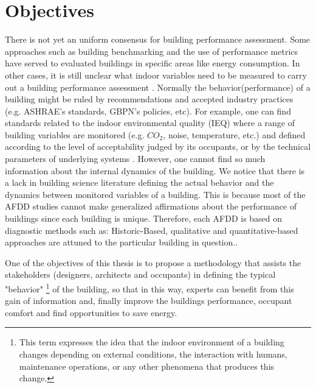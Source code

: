 
\section{Objectives}

There is not yet an uniform consensus for building performance assessment. Some approaches such as building benchmarking and the use of performance metrics have served to evaluated buildings in specific areas like energy consumption. In other cases, it is still unclear what indoor variables need to be measured to carry out a building performance assessment \cite{owens2012measuring, web_NIOSH}. Normally the behavior(performance) of a building might be ruled by recommendations and accepted industry practices (e.g. ASHRAE's standards, GBPN's policies, etc). For example, one can find standards related to the indoor environmental quality (IEQ) where a range of building variables are monitored (e.g. $CO_2$, noise, temperature, etc.) and defined according to the level of acceptability judged by its occupants, or by the technical parameters of underlying systems \cite{owens2012measuring}. However, one cannot find so much information about the internal dynamics of the building. We notice that there is a lack in building science literature defining the actual behavior and the dynamics between monitored variables of a building. This is because most of the AFDD studies cannot make generalized affirmations about the performance of buildings since each building is unique. Therefore, each AFDD is based on diagnostic methods such as: Historic-Based, qualitative and quantitative-based approaches are attuned to the particular building in question.\cite{katipamula2005methods}. 


One of the objectives of this thesis is to propose a methodology that assists the stakeholders (designers, architects and occupants) in defining the typical "behavior" \footnote{This term expresses the idea that the indoor environment of a building changes depending on external conditions, the interaction with humans, maintenance operations, or any other phenomena that produces this change.} of the building, so that in this way, experts can benefit from this gain of information and, finally improve the buildings performance, occupant comfort and find opportunities to save energy. 

